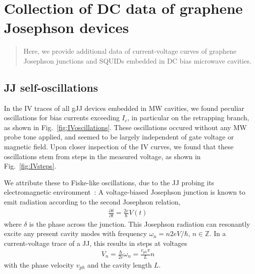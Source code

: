 \newchapstyle
\chapter{Collection of DC data of graphene Josephson devices}
\label{chap:gJJmisc}

%
%
\begin{abstract}
	\color{title}
	Here, we provide additional data of current-voltage curves of graphene Josephson junctions and SQUIDs embedded in DC bias microwave cavities.
\end{abstract}

\afterpage{\pagecolor{none}}\newpage

\section{JJ self-oscillations}
In the IV traces of all gJJ devices embedded in MW cavities, we found peculiar oscillations for bias currents exceeding $I_c$, in particular on the retrapping branch, as shown in Fig.~\ref{fig:IVoscillations}.
%
These oscillations occured without any MW probe tone applied, and seemed to be largely independent of gate voltage or magnetic field.
%
Upon closer inspection of the IV curves, we found that these oscillations stem from steps in the measured voltage, as shown in Fig.~\ref{fig:IVsteps}.

We attribute these to Fiske-like oscillations, due to the JJ probing its electromagnetic environment~\cite{fiskeTemperatureMagneticField1964,eckSelfDetectionAcJosephson1964,coonJosephsonAcStep1965}:
%
A voltage-biased Josephson junction is known to emit radiation according to the second Josephson relation,
%
\begin{align}
\frac{\partial \delta}{\partial t}=\frac{2e}{\hbar}V(t)
\end{align}
%
where $\delta$ is the phase across the junction.
%
This Josephson radiation can resonantly excite any present cavity modes with frequency $\omega_n=n2eV/\hbar$, $n\in\mathbb{Z}$.
%
In a current-voltage trace of a JJ, this results in steps at voltages
%
\begin{align}
V_n=\frac{\hbar}{2e}\omega_n=\frac{v_{ph}\pi}{L}n
\end{align}
%
with the phase velocity $v_{ph}$ and the cavity length $L$.

